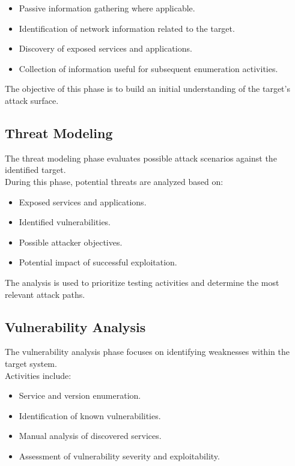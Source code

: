 \begin{itemize}
    \item Passive information gathering where applicable.
    \item Identification of network information related to the target.
    \item Discovery of exposed services and applications.
    \item Collection of information useful for subsequent enumeration activities.
\end{itemize}

The objective of this phase is to build an initial understanding of the target's
attack surface.

\subsection{Threat Modeling}

The threat modeling phase evaluates possible attack scenarios against the
identified target.
\\

During this phase, potential threats are analyzed based on:

\begin{itemize}
    \item Exposed services and applications.
    \item Identified vulnerabilities.
    \item Possible attacker objectives.
    \item Potential impact of successful exploitation.
\end{itemize}

The analysis is used to prioritize testing activities and determine the most
relevant attack paths.

\subsection{Vulnerability Analysis}

The vulnerability analysis phase focuses on identifying weaknesses within the
target system.
\\

Activities include:

\begin{itemize}
    \item Service and version enumeration.
    \item Identification of known vulnerabilities.
    \item Manual analysis of discovered services.
    \item Assessment of vulnerability severity and exploitability.
\end{itemize}

